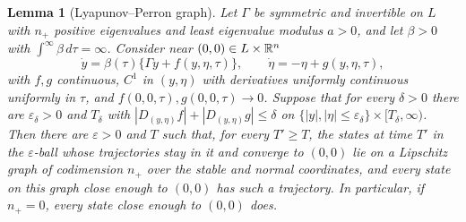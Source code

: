 \documentclass{article} %
\theoremstyle{plain}
\newtheorem{lemma}[theorem]{Lemma}
\theoremstyle{definition}
\theoremstyle{remark}
\begin{document}
\begin{lemma}[Lyapunov--Perron graph]
\label{lem:lp}
Let $\Gamma$ be symmetric and invertible on $L$ with $n_+$ positive eigenvalues and least
eigenvalue modulus $a>0$, and let $\beta>0$ with $\int^\infty\beta\,d\tau=\infty$. Consider near
$(0,0)\in L\times\mathbb{R}^n$
\[
\dot y=\beta(\tau)\{\Gamma y+f(y,\eta,\tau)\},\qquad \dot\eta=-\eta+g(y,\eta,\tau),
\]
with $f,g$ continuous, $C^1$ in $(y,\eta)$ with derivatives uniformly continuous uniformly in
$\tau$, and $f(0,0,\tau),g(0,0,\tau)\to0$. Suppose that for every $\delta>0$ there are
$\varepsilon_\delta>0$ and $T_\delta$ with $|D_{(y,\eta)}f|+|D_{(y,\eta)}g|\le\delta$ on
$\{|y|,|\eta|\le\varepsilon_\delta\}\times[T_\delta,\infty)$. Then there are $\varepsilon>0$ and $T$
such that, for every $T'\ge T$, the states at time $T'$ in the $\varepsilon$-ball whose trajectories
stay in it and converge to $(0,0)$ lie on a Lipschitz graph of codimension $n_+$ over the stable and
normal coordinates, and every state on this graph close enough to $(0,0)$ has such a trajectory.
In particular, if $n_+=0$, every state close enough to $(0,0)$ does.
\end{lemma}
\end{document}
